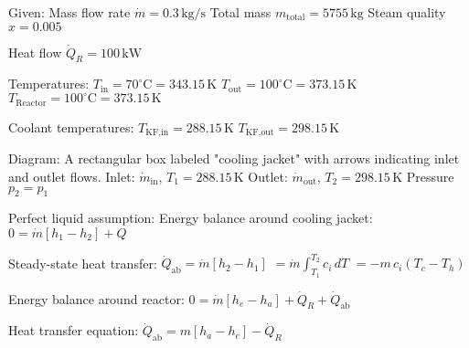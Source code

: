 Given:  
Mass flow rate \( \dot{m} = 0.3 \, \text{kg/s} \)  
Total mass \( m_{\text{total}} = 5755 \, \text{kg} \)  
Steam quality \( x = 0.005 \)  

Heat flow \( \dot{Q}_R = 100 \, \text{kW} \)  

Temperatures:  
\( T_{\text{in}} = 70^\circ \text{C} = 343.15 \, \text{K} \)  
\( T_{\text{out}} = 100^\circ \text{C} = 373.15 \, \text{K} \)  
\( T_{\text{Reactor}} = 100^\circ \text{C} = 373.15 \, \text{K} \)  

Coolant temperatures:  
\( T_{\text{KF,in}} = 288.15 \, \text{K} \)  
\( T_{\text{KF,out}} = 298.15 \, \text{K} \)  

Diagram:  
A rectangular box labeled "cooling jacket" with arrows indicating inlet and outlet flows.  
Inlet: \( \dot{m}_{\text{in}} \), \( T_1 = 288.15 \, \text{K} \)  
Outlet: \( \dot{m}_{\text{out}} \), \( T_2 = 298.15 \, \text{K} \)  
Pressure \( p_2 = p_1 \)  

Perfect liquid assumption:  
Energy balance around cooling jacket:  
\( 0 = \dot{m} \left[ h_1 - h_2 \right] + Q \)  

Steady-state heat transfer:  
\( \dot{Q}_{\text{ab}} = \dot{m} \left[ h_2 - h_1 \right] \)  
\( = \dot{m} \int_{T_1}^{T_2} c_i \, dT \)  
\( = -m \, c_i \left( T_c - T_h \right) \)  

Energy balance around reactor:  
\( 0 = \dot{m} \left[ h_e - h_a \right] + \dot{Q}_R + \dot{Q}_{\text{ab}} \)  

Heat transfer equation:  
\( \dot{Q}_{\text{ab}} = m \left[ h_a - h_e \right] - \dot{Q}_R \)